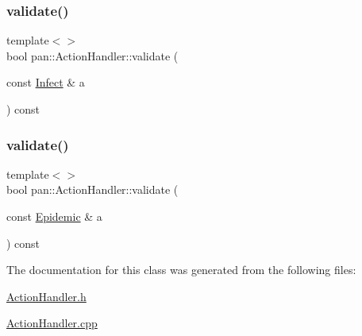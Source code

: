 \subsubsection{\texorpdfstring{validate()}{validate()}\hspace{0.1cm}{\footnotesize\ttfamily [13/14]}}
{\footnotesize\ttfamily template$<$$>$ \\
bool pan\+::\+Action\+Handler\+::validate (\begin{DoxyParamCaption}\item[{const \hyperlink{classpan_1_1_infect}{Infect} \&}]{a }\end{DoxyParamCaption}) const}

\mbox{\label{classpan_1_1_action_handler_a28ed770b339cba18d970a153c82d3c45}} 
\subsubsection{\texorpdfstring{validate()}{validate()}\hspace{0.1cm}{\footnotesize\ttfamily [14/14]}}
{\footnotesize\ttfamily template$<$$>$ \\
bool pan\+::\+Action\+Handler\+::validate (\begin{DoxyParamCaption}\item[{const \hyperlink{classpan_1_1_epidemic}{Epidemic} \&}]{a }\end{DoxyParamCaption}) const}



The documentation for this class was generated from the following files\+:\begin{DoxyCompactItemize}
\item 
\hyperlink{_action_handler_8h}{Action\+Handler.\+h}\item 
\hyperlink{_action_handler_8cpp}{Action\+Handler.\+cpp}\end{DoxyCompactItemize}
